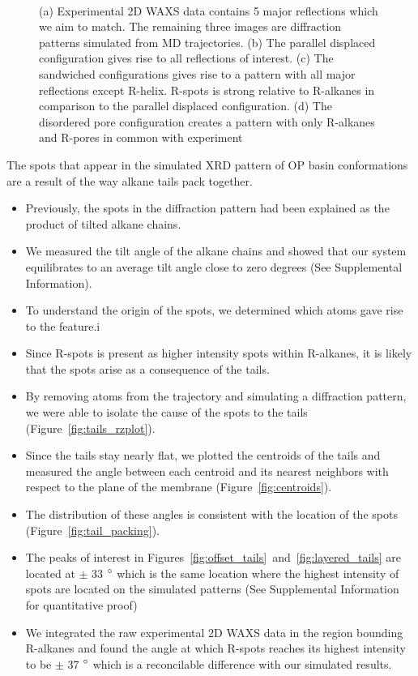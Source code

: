 \documentclass{article}
\begin{document}
\begin{figure}[ht]
\begin{subfigure}{0.14\linewidth}
  \end{subfigure}
  \caption{(a) Experimental 2D WAXS data contains 5 major reflections which we aim to match. The remaining
  three images are diffraction patterns simulated from MD trajectories. (b) The parallel displaced
  configuration gives rise to all reflections of interest. (c) The sandwiched configurations gives rise to a
  pattern with all major reflections except R-helix. R-spots is strong relative to R-alkanes in comparison
  to the parallel displaced configuration. (d) The disordered pore configuration creates a pattern with only
  R-alkanes and R-pores in common with experiment}~\label{fig:xrd}
  \end{figure}

  The spots that appear in the simulated XRD pattern of OP basin
  conformations are a result of the way alkane tails pack together.
  \begin{itemize}
  	\item Previously, the spots in the diffraction pattern had been explained 
	as the product of tilted alkane chains.
	\item We measured the tilt angle of the alkane chains and showed that our 
	system equilibrates to an average tilt angle close to zero degrees (See Supplemental Information). 
	\item To understand the origin of the spots, we determined which atoms gave rise to the feature.i
	\item Since R-spots is present as higher intensity spots within R-alkanes, it is likely
        that the spots arise as a consequence of the tails. 
	\item By removing atoms from the trajectory and simulating a diffraction 
	pattern, we were able to isolate the cause of the spots to the tails (Figure~\ref{fig:tails_rzplot}).
	\item Since the tails stay nearly flat, we plotted the centroids of the 
	tails and measured the angle between each centroid and its nearest neighbors
	with respect to the plane of the membrane (Figure~\ref{fig:centroids}).
	\item The distribution of these angles is consistent with the location of 
	the spots (Figure~\ref{fig:tail_packing}).
	\item The peaks of interest in Figures~\ref{fig:offset_tails}~and~\ref{fig:layered_tails}
	are located at $\pm$ 33 $\degree$ which is the same location where the highest intensity
	of spots are located on the simulated patterns (See Supplemental Information for quantitative proof)
	\item We integrated the raw experimental 2D WAXS data in the region bounding R-alkanes 
        and found the angle at which R-spots reaches its highest intensity to be $\pm$ 37 $\degree$ which 
        is a reconcilable difference with our simulated results.  
  \end{itemize}
 
\end{document}
